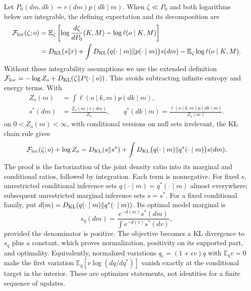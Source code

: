 Let $P_0(dm,dk)=r(dm)p(dk\mid m)$. When $\zeta\ll P_0$ and both logarithms below are integrable, the defining expectation and its decomposition are
\begin{align}
\mathcal F_{\rm loc}(\zeta;o)
&=\mathbb E_\zeta\left[\log\frac{d\zeta}{dP_0}(K,M)-\log\ell(o\mid K,M)\right] \nonumber\\
&=D_{\rm KL}(s\Vert r)
+\int D_{\rm KL}\bigl(q(\cdot\mid m)\Vert p(\cdot\mid m)\bigr)s(dm)
-\mathbb E_\zeta\log\ell(o\mid K,M).
\label{eq:one_law_conditional_vfe}
\end{align}
Without these integrability assumptions we use the extended definition
$\mathcal F_{\rm loc}=-\log Z_o+D_{\rm KL}(\zeta\Vert P(\cdot\mid o))$.
This avoids subtracting infinite entropy and energy terms. With
\begin{equation}
\begin{aligned}
Z_o(m)&=\int\ell(o\mid k,m)p(dk\mid m),\\
s^*(dm)&=\frac{Z_o(m)r(dm)}{Z_o},\qquad
q^*(dk\mid m)=\frac{\ell(o\mid k,m)p(dk\mid m)}{Z_o(m)}.
\end{aligned}
\label{eq:one_law_posterior_blocks}
\end{equation}
on $0<Z_o(m)<\infty$, with conditional versions on null sets irrelevant, the KL chain rule gives
\begin{equation}
\mathcal F_{\rm loc}(\zeta;o)+\log Z_o
=D_{\rm KL}(s\Vert s^*)
+\int D_{\rm KL}\bigl(q(\cdot\mid m)\Vert q^*(\cdot\mid m)\bigr)s(dm).
\label{eq:one_law_posterior_chain}
\end{equation}
The proof is the factorization of the joint density ratio into its marginal and conditional ratios, followed by integration. Each term is nonnegative. For fixed $s$, unrestricted conditional inference sets $q(\cdot\mid m)=q^*(\cdot\mid m)$ almost everywhere; subsequent unrestricted marginal inference sets $s=s^*$. For a fixed conditional family, put $d(m)=D_{\rm KL}(q(\cdot\mid m)\Vert q^*(\cdot\mid m))$. Its optimal model marginal is
\begin{equation}
s_q(dm)=\frac{e^{-d(m)}s^*(dm)}{\int e^{-d(v)}s^*(dv)},
\label{eq:one_law_model_stationarity}
\end{equation}
provided the denominator is positive. The objective becomes a KL divergence to $s_q$ plus a constant, which proves normalization, positivity on its supported part, and optimality. Equivalently, normalized variations $q_\epsilon=(1+\epsilon v)q$ with $\mathbb E_qv=0$ make the first variation $\mathbb E_q[v\log(dq/dq^*)]$ vanish exactly at the conditional target in the interior. These are optimizer statements, not identities for a finite sequence of updates.

